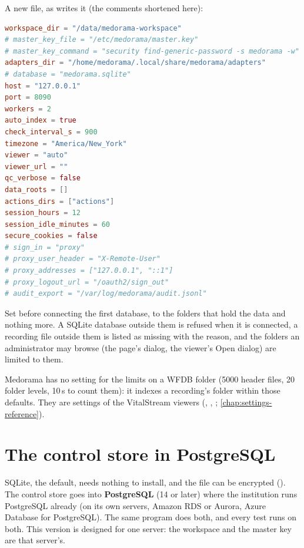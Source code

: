 A new file, as  writes it (the comments shortened here):
\begin{lstlisting}[language=TOML]
workspace_dir = "/data/medorama-workspace"
# master_key_file = "/etc/medorama/master.key"
# master_key_command = "security find-generic-password -s medorama -w"
adapters_dir = "/home/medorama/.local/share/medorama/adapters"
# database = "medorama.sqlite"
host = "127.0.0.1"
port = 8090
workers = 2
auto_index = true
check_interval_s = 900
timezone = "America/New_York"
viewer = "auto"
viewer_url = ""
qc_verbose = false
data_roots = []
actions_dirs = ["actions"]
session_hours = 12
session_idle_minutes = 60
secure_cookies = false
# sign_in = "proxy"
# proxy_user_header = "X-Remote-User"
# proxy_addresses = ["127.0.0.1", "::1"]
# proxy_logout_url = "/oauth2/sign_out"
# audit_export = "/var/log/medorama/audit.jsonl"
\end{lstlisting}

\begin{tip}
Set  before connecting the first database, to the folders that hold the data
and nothing more. A SQLite database outside them is refused when it is connected, a recording
file outside them is listed as missing with the reason, and the folders an administrator may
browse (the page's  dialog, the viewer's Open dialog) are limited to them.
\end{tip}

Medorama has no setting for the limits on a WFDB folder (5000 header files, 20 folder levels,
10\,s to count them): it indexes a recording's folder within those defaults. They are settings of
the VitalStream viewers (, , ;
\cref{chap:settings-reference}).

\section{The control store in PostgreSQL}
\label{sec:administration-postgres}

SQLite, the default, needs nothing to install, and the file can be encrypted ().
The control store goes into \textbf{PostgreSQL} (14 or later) where the institution runs
PostgreSQL already (on its own servers, Amazon RDS or Aurora, Azure Database for PostgreSQL).
The same program does both, and every test runs on both. This version is designed for one
server: the workspace and the master key are that server's.

